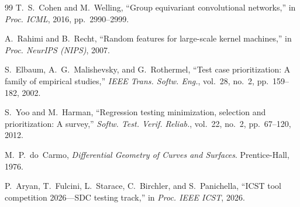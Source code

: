 \begin{thebibliography}{99}
 T.~S.~Cohen and M.~Welling, ``Group equivariant convolutional
networks,'' in \textit{Proc. ICML}, 2016, pp.~2990--2999.

 A.~Rahimi and B.~Recht, ``Random features for large-scale kernel
machines,'' in \textit{Proc. NeurIPS (NIPS)}, 2007.

 S.~Elbaum, A.~G.~Malishevsky, and G.~Rothermel, ``Test case
prioritization: A family of empirical studies,'' \textit{IEEE Trans. Softw.
Eng.}, vol.~28, no.~2, pp.~159--182, 2002.

 S.~Yoo and M.~Harman, ``Regression testing minimization,
selection and prioritization: A survey,'' \textit{Softw. Test. Verif. Reliab.},
vol.~22, no.~2, pp.~67--120, 2012.

 M.~P.~do~Carmo, \textit{Differential Geometry of Curves and
Surfaces}. Prentice-Hall, 1976.

 P.~Aryan, T.~Fulcini, L.~Starace, C.~Birchler, and
S.~Panichella, ``ICST tool competition 2026---SDC testing track,'' in
\textit{Proc. IEEE ICST}, 2026.

\end{thebibliography}
